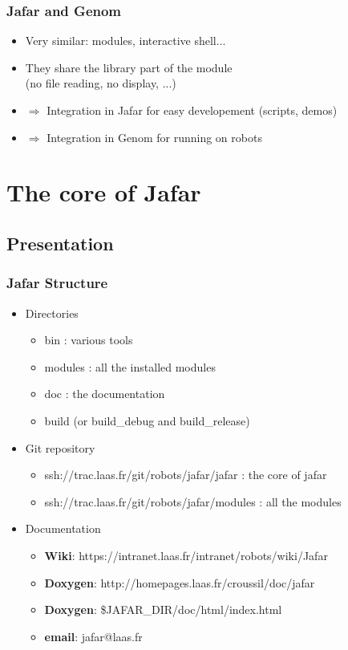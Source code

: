\documentclass[compress]{beamer}
\begin{document}
\begin{frame}
 \frametitle{Jafar and Genom}
 \begin{itemize}
  \item<1-> Very similar: modules, interactive shell...
  \item<2-> They share the library part of the module\\ (no file reading, no display, ...)
  \item<3-> $\Rightarrow$ Integration in Jafar for easy developement (scripts, demos)
  \item<4-> $\Rightarrow$ Integration in Genom for running on robots
 \end{itemize}
\end{frame}



\section{The core of Jafar}
\subsection{Presentation}


\begin{frame}
 \frametitle{Jafar Structure}
 \begin{itemize}
  \item<1-> Directories
    \begin{itemize}
     \item<2-> bin : various tools
     \item<3-> modules : all the installed modules
     \item<4-> doc : the documentation
     \item<5-> build (or build\_debug and build\_release)
    \end{itemize}
  \item<5-> Git repository
    \begin{itemize}
     \item<6-> ssh://trac.laas.fr/git/robots/jafar/jafar : the core of jafar
     \item<7-> ssh://trac.laas.fr/git/robots/jafar/modules : all the modules
    \end{itemize}
  \item<8-> Documentation
    \begin{itemize}
     \item<9-> \textbf{Wiki}: https://intranet.laas.fr/intranet/robots/wiki/Jafar
     \item<10-> \textbf{Doxygen}: http://homepages.laas.fr/croussil/doc/jafar
     \item<11-> \textbf{Doxygen}: \$JAFAR\_DIR/doc/html/index.html
     \item<12-> \textbf{email}: jafar@laas.fr
    \end{itemize}
 \end{itemize}
\end{frame}
\end{document}
